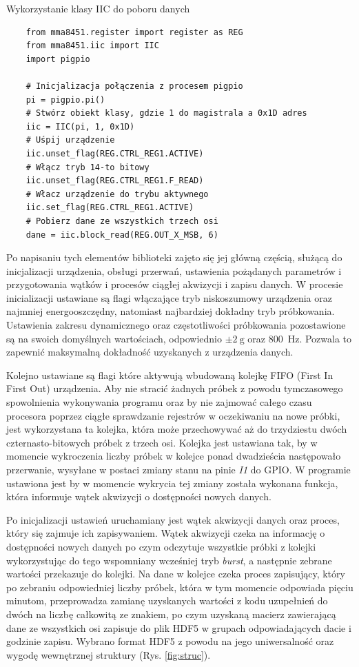 \documentclass[a4paper,12pt]{mwart}
\begin{document}
\begin{program}
  \caption{Wykorzystanie klasy IIC do poboru danych}
  \begin{lstlisting}
    from mma8451.register import register as REG
    from mma8451.iic import IIC
    import pigpio

    # Inicjalizacja połączenia z procesem pigpio
    pi = pigpio.pi()
    # Stwórz obiekt klasy, gdzie 1 do magistrala a 0x1D adres
    iic = IIC(pi, 1, 0x1D)
    # Uśpij urządzenie
    iic.unset_flag(REG.CTRL_REG1.ACTIVE)
    # Włącz tryb 14-to bitowy
    iic.unset_flag(REG.CTRL_REG1.F_READ)
    # Włacz urządzenie do trybu aktywnego
    iic.set_flag(REG.CTRL_REG1.ACTIVE)
    # Pobierz dane ze wszystkich trzech osi
    dane = iic.block_read(REG.OUT_X_MSB, 6)
  \end{lstlisting}
  \label{code:iic}
\end{program}

Po napisaniu tych elementów biblioteki zajęto się jej główną częścią, służącą
do inicjalizacji urządzenia, obsługi przerwań, ustawienia pożądanych parametrów
i przygotowania wątków i procesów ciągłej akwizycji i zapisu danych. W procesie
inicializacji ustawiane są flagi włączające tryb niskoszumowy urządzenia oraz
najmniej energooszczędny, natomiast najbardziej dokładny tryb próbkowania.
Ustawienia zakresu dynamicznego oraz częstotliwości próbkowania pozostawione są
na swoich domyślnych wartościach, odpowiednio $\pm\SI{2}{\g}$ oraz
\SI{800}{\hertz}. Pozwala to zapewnić maksymalną dokładność uzyskanych z
urządzenia danych.

Kolejno ustawiane są flagi które aktywują wbudowaną kolejkę FIFO (First In
First Out) urządzenia. Aby nie stracić żadnych próbek z powodu tymczasowego
spowolnienia wykonywania programu oraz by nie zajmować całego czasu procesora
poprzez ciągłe sprawdzanie rejestrów w oczekiwaniu na nowe próbki, jest
wykorzystana ta kolejka, która może przechowywać aż do trzydziestu dwóch
czternasto-bitowych próbek z trzech osi. Kolejka jest ustawiana tak, by w
momencie wykroczenia liczby próbek w kolejce ponad dwadzieścia następowało
przerwanie, wysyłane w postaci zmiany stanu na pinie \emph{I1} do GPIO.
W programie ustawiona jest by w momencie wykrycia tej zmiany została wykonana
funkcja, która informuje wątek akwizycji o dostępności nowych danych.

Po inicjalizacji ustawień uruchamiany jest wątek akwizycji danych oraz proces,
który się zajmuje ich zapisywaniem. Wątek akwizycji czeka na informację o
dostępności nowych danych po czym odczytuje wszystkie próbki z kolejki
wykorzystując do tego wspomniany wcześniej tryb \emph{burst}, a następnie
zebrane wartości przekazuje do kolejki. Na dane w kolejce czeka proces
zapisujący, który po zebraniu odpowiedniej liczby próbek, która w tym momencie
odpowiada pięciu minutom, przeprowadza zamianę uzyskanych wartości z kodu
uzupełnień do dwóch na liczbę całkowitą ze znakiem, po czym uzyskaną macierz
zawierającą dane ze wszystkich osi zapisuje do plik HDF5 w grupach
odpowiadających dacie i godzinie zapisu. Wybrano format HDF5 z powodu na jego
uniwersalność oraz wygodę wewnętrznej struktury (Rys. \ref{fig:struc}).
\end{document}
